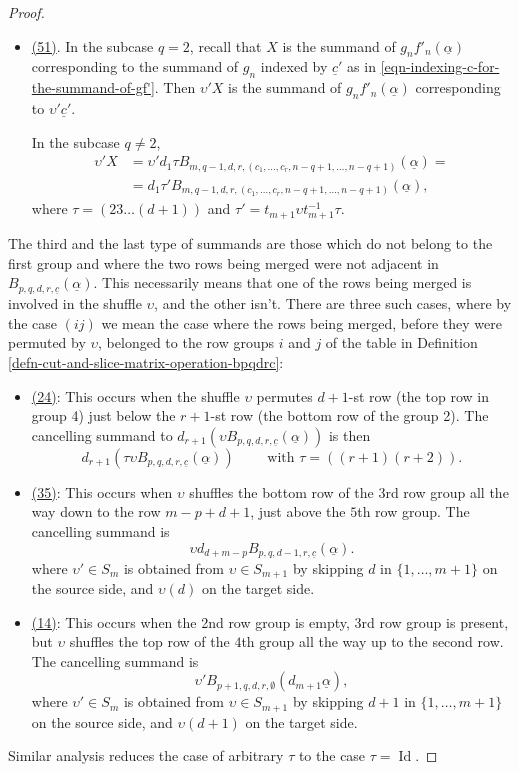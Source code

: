 \documentclass[10pt,a4paper]{amsart}
\DeclareMathOperator{\id}{Id}
\begin{document}
\begin{proof}
\begin{itemize}
\item \underline{(51)}. In the subcase $q = 2$, recall that
$X$ is the summand of $g_n f'_n(\underline{\alpha})$ 
corresponding to the summand of $g_n$ indexed by $\underline{c}'$
as in \eqref{eqn-indexing-c-for-the-summand-of-gf'}. 
Then $\upsilon' X$ is the summand of 
$g_n f'_n(\underline{\alpha})$ corresponding to $\upsilon' \underline{c}'$. 

In the subcase $q \neq 2$, 
\begin{align*}
\upsilon' X & = 
\upsilon' d_{1} \tau B_{m,q-1,d,r,(c_1, \dots, c_r, n-q+1, \dots,
n-q+1)}(\underline{\alpha}) = \\
& = 
d_{1} \tau' B_{m,q-1,d,r,(c_1, \dots, c_r, n-q+1, \dots,
n-q+1)}(\underline{\alpha}),
\end{align*}
where $\tau = (23\dots(d+1))$ and $\tau' = t_{m+1} \upsilon
t_{m+1}^{-1} \tau$. 
\end{itemize}
 
The third and the last type of summands are those which do not belong
to the first group and where the two rows being merged were not adjacent in 
$B_{p,q,d,r,\underline{c}}(\underline{\alpha})$. This necessarily
means that one of the rows being merged is involved in the shuffle $\upsilon$, 
and the other isn't. There are three such cases, where by the case
$(ij)$ we mean the case where the rows being merged, before
they were permuted by $\upsilon$, belonged to the row
groups $i$ and $j$ of the table in 
Definition \ref{defn-cut-and-slice-matrix-operation-bpqdrc}:
\begin{itemize}
\item \underline{(24)}: This occurs when the shuffle $\upsilon$
permutes $d+1$-st row (the top row in group 4) just below the $r+1$-st
row (the bottom row of the group 2). The cancelling summand to
$d_{r+1} \left(\upsilon B_{p,q,d,r,\underline{c}}(\underline{\alpha})\right)$
is then 
$$ d_{r+1} \left(\tau \upsilon
B_{p,q,d,r,\underline{c}}(\underline{\alpha})\right) \quad \quad
\text{ with } \tau = ((r+1)(r+2)).$$
\item \underline{(35)}: This occurs when $\upsilon$ shuffles the
bottom row of the 3rd row group all the way down to the row $m-p+d+1$, 
just above the $5$th row group.  The cancelling summand is 
$$ \upsilon d_{d + m - p} B_{p,q,d-1,r,\underline{c}}(\underline{\alpha}). $$
where $\upsilon' \in S_m$ is obtained from $\upsilon \in S_{m+1}$ by
skipping $d$ in $\{1, \dots, m+1\}$ on the source side, and 
$\upsilon(d)$ on the target side.
\item \underline{(14)}: This occurs when the 2nd row group is empty, 
3rd row group is present, but $\upsilon$ shuffles the top row of the
$4$th group all the way up to the second row. 
The cancelling summand is 
$$ \upsilon' B_{p+1, q, d, r, \emptyset}(d_{m+1}\underline{\alpha}), $$
where $\upsilon' \in S_m$ is obtained from $\upsilon \in S_{m+1}$ by
skipping $d+1$ in $\{1, \dots, m+1\}$ on the source side, and 
$\upsilon(d+1)$ on the target side. 
\end{itemize}

Similar analysis reduces the case of arbitrary $\tau$ to the case 
$\tau = \id$.  
\end{proof}
\end{document}

